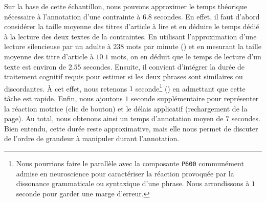 			Sur la base de cette échantillon, nous pouvons approximer le temps théorique nécessaire à l'annotation d'une contrainte à $6.8$ secondes.
			En effet, il faut d'abord considérer la taille moyenne des titres d'article à lire et en déduire le temps dédié à la lecture des deux textes de la contraintes.
			En utilisant l'approximation d'une lecture silencieuse par un adulte à $238$ mots par minute (\cite{brysbaert:2019:how-many-words}) et en mesurant la taille moyenne des titre d'article à $10.1$ mots, on en déduit que le temps de lecture d'un texte est environ de $2.55$ secondes.
			Ensuite, il convient d'intégrer la durée de traitement cognitif requis pour estimer si les deux phrases sont similaires ou discordantes.
			À cet effet, nous retenons $1$ seconde\footnote{
				Nous pourrions faire le parallèle avec la composante \texttt{P600} communément admise en neuroscience pour caractériser la réaction provoquée par la dissonance grammaticale ou syntaxique d'une phrase.
				Nous arrondissons à $1$ seconde pour garder une marge d'erreur.
			} (\cite{purves-brannon:2013:principles-cognitive-neuroscience})
			en admettant que cette tâche est rapide.
			Enfin, nous ajoutons $1$ seconde supplémentaire pour représenter la réaction motrice (clic de bouton) et le délais applicatif (rechargement de la page).
			Au total, nous obtenons ainsi un temps d'annotation moyen de $7$ secondes.
			Bien entendu, cette durée reste approximative, mais elle nous permet de discuter de l'ordre de grandeur à manipuler durant l'annotation.
			

